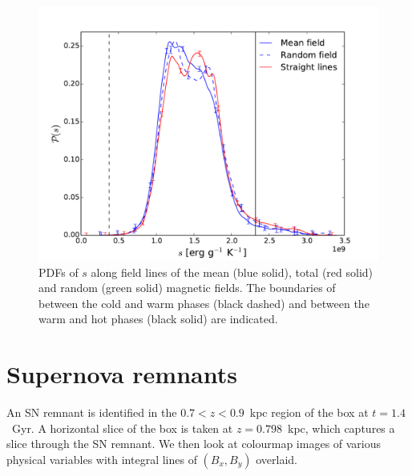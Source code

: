 \documentclass[useAMS,usenatbib]{mn2e}
\begin{document}
\begin{figure}[h!]
\includegraphics[width=\linewidth]{fig/allall_wrn.pdf}
\caption{PDFs of $s$ along field lines of the mean (blue solid), total (red solid) and random (green solid) magnetic fields. The boundaries of between the cold and warm phases (black dashed) and between the warm and hot phases (black solid) are indicated.}
\label{fig:tot_pdfs}
\end{figure}
\section{Supernova remnants}\label{sec:sn_rem}
An SN remnant is identified in the $0.7<z<0.9$~kpc region of the box at $t=1.4$~Gyr. A horizontal slice of the box is taken at $z=0.798$~kpc, which captures a slice through the SN remnant. We then look at colourmap images of various physical variables with integral lines of $(B_x,B_y)$ overlaid. 
\end{document}

